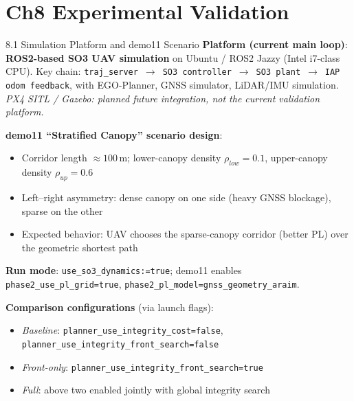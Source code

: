 \documentclass[10pt,aspectratio=169,xcolor=dvipsnames]{beamer}
\newcommand{\1}{\mathbb{1}}
\newcommand{\innov}[1]{\textcolor{NavyBlue}{\textbf{#1}}}
\begin{document}
\section{Ch8 Experimental Validation}

\begin{frame}{8.1 Simulation Platform and demo11 Scenario}
  \small
  \textbf{Platform (current main loop)}: \innov{ROS2-based SO3 UAV simulation} on Ubuntu / ROS2 Jazzy (Intel i7-class CPU). Key chain: \texttt{traj\_server}~$\to$~\texttt{SO3 controller}~$\to$~\texttt{SO3 plant}~$\to$~\texttt{IAP odom feedback}, with EGO-Planner, GNSS simulator, LiDAR/IMU simulation.\\
  \emph{PX4 SITL / Gazebo: planned future integration, not the current validation platform.}

  \medskip
  \textbf{demo11 ``Stratified Canopy'' scenario design}:
  \begin{itemize}\scriptsize
    \item Corridor length $\approx 100\,\si{\meter}$; lower-canopy density $\rho_{low}=0.1$, upper-canopy density $\rho_{up}=0.6$
    \item Left--right asymmetry: dense canopy on one side (heavy GNSS blockage), sparse on the other
    \item Expected behavior: UAV chooses the sparse-canopy corridor (better PL) over the geometric shortest path
  \end{itemize}

  \textbf{Run mode}: \texttt{use\_so3\_dynamics:=true}; demo11 enables \texttt{phase2\_use\_pl\_grid=true}, \texttt{phase2\_pl\_model=gnss\_geometry\_araim}.

  \textbf{Comparison configurations} (via launch flags):
  \begin{itemize}\scriptsize
    \item \emph{Baseline}: \texttt{planner\_use\_integrity\_cost=false}, \texttt{planner\_use\_integrity\_front\_search=false}
    \item \emph{Front-only}: \texttt{planner\_use\_integrity\_front\_search=true}
    \item \emph{Full}: above two enabled jointly with global integrity search
  \end{itemize}
\end{frame}
\end{document}

